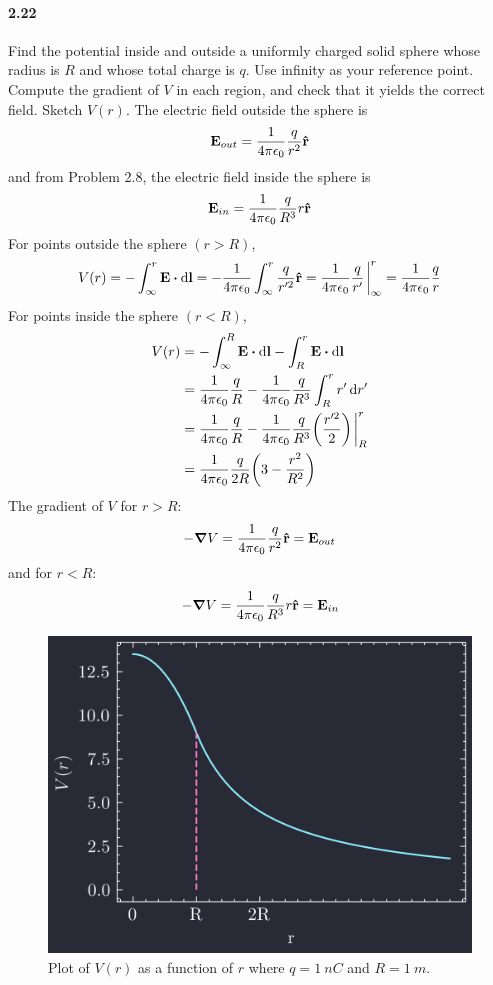 \documentclass[../main.tex]{subfiles}
\begin{document}
\pagestyle{fancy}

\setcounter{section}{3}
\paragraph{2.22} \label{prob:2_21}
Find the potential inside and outside a uniformly charged solid sphere whose radius is $R$ and whose
total charge is $q$. Use infinity as your reference point. Compute the gradient of $V$ in each
region, and check that it yields the correct field. Sketch $V(r)$.
\barh
The electric field outside the sphere is
\[ \vb{E}_{out} = \frac{1}{4\pi\epsilon_0} \frac{q}{r^2} \vu{r} \]
and from Problem 2.8, the electric field inside the sphere is
\[ \vb{E}_{in} = \frac{1}{4\pi\epsilon_0} \frac{q}{R^3} r \vu{r} \]
For points outside the sphere $(r > R)$,
\[
    V(r) = - \int_\infty^r \vb{E} \vdot \dd{\vb{l}} = - \ke \int_\infty^r \frac{q}{r'^2} \vu{r}
    = \ke \frac{q}{r'} \eval_\infty^r = \ke \frac{q}{r}
\]
For points inside the sphere $(r < R)$,
\begin{align*}
    V(r) &= - \int_\infty^R \vb{E} \vdot \dd{\vb{l}} - \int_R^r \vb{E} \vdot \dd{\vb{l}} \\
    &= \ke \frac{q}{R} - \ke \frac{q}{R^3} \int_R^r r' \dd{r'} \\
    &= \ke \frac{q}{R} - \ke \frac{q}{R^3} \qt(\frac{r'^2}{2}) \eval_R^r \\
    &= \ke \frac{q}{2R} \qt(3 - \frac{r^2}{R^2}) 
\end{align*}
The gradient of $V$ for $r > R$:
\[ -\grad V = \frac{1}{4\pi\epsilon_0} \frac{q}{r^2} \vu{r} = \vb{E}_{out} \]
and for $r < R$:
\[ -\grad V = \frac{1}{4\pi\epsilon_0} \frac{q}{R^3} r \vu{r} = \vb{E}_{in} \]
\begin{figure}[ht]
    \centering
    \includegraphics[width=0.5\linewidth]{images/fig2_21.png}
    \captionsetup{width=0.8\linewidth}
    \caption{Plot of $V(r)$ as a function of $r$ where $q = \qty{1}{nC}$ and $R = \qty{1}{m}$.}
    \label{fig:2_21}
\end{figure}
\end{document}
